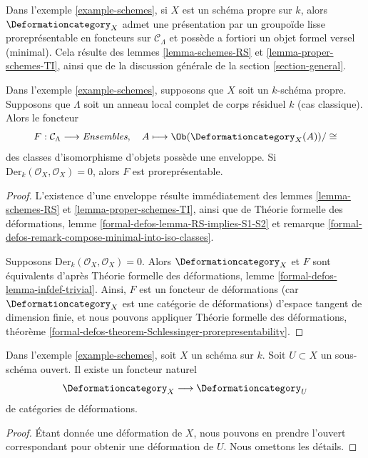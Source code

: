 \noindent
Dans l'exemple \ref{example-schemes}, si $X$ est un schéma propre sur $k$,
alors $\Deformationcategory_X$
admet une présentation par un groupoïde lisse proreprésentable en foncteurs
sur $\mathcal{C}_\Lambda$
et possède a fortiori un objet formel versel (minimal). Cela résulte
des lemmes \ref{lemma-schemes-RS} et
\ref{lemma-proper-schemes-TI},
ainsi que de la discussion générale de la section \ref{section-general}.

\begin{lemma}
\label{lemma-schemes-hull}
Dans l'exemple \ref{example-schemes}, supposons que $X$ soit un $k$-schéma propre.
Supposons que $\Lambda$ soit un anneau local complet de corps résiduel $k$
(cas classique). Alors le foncteur
$$
F : \mathcal{C}_\Lambda \longrightarrow \textit{Ensembles},\quad
A \longmapsto \Ob(\Deformationcategory_X(A))/\cong
$$
des classes d'isomorphisme d'objets possède une enveloppe. Si
$\text{Der}_k(\mathcal{O}_X, \mathcal{O}_X) = 0$, alors
$F$ est proreprésentable.
\end{lemma}

\begin{proof}
L'existence d'une enveloppe résulte immédiatement des
lemmes \ref{lemma-schemes-RS} et \ref{lemma-proper-schemes-TI}, ainsi que de
Théorie formelle des déformations, lemme \ref{formal-defos-lemma-RS-implies-S1-S2}
et remarque \ref{formal-defos-remark-compose-minimal-into-iso-classes}.

\medskip\noindent
Supposons $\text{Der}_k(\mathcal{O}_X, \mathcal{O}_X) = 0$. Alors
$\Deformationcategory_X$ et $F$ sont équivalents d'après
Théorie formelle des déformations, lemme \ref{formal-defos-lemma-infdef-trivial}.
Ainsi, $F$ est un foncteur de déformations (car $\Deformationcategory_X$ est une
catégorie de déformations) d'espace tangent de dimension finie, et nous pouvons appliquer
Théorie formelle des déformations, théorème
\ref{formal-defos-theorem-Schlessinger-prorepresentability}.
\end{proof}

\begin{lemma}
\label{lemma-open}
Dans l'exemple \ref{example-schemes}, soit $X$ un schéma sur $k$.
Soit $U \subset X$ un sous-schéma ouvert.
Il existe un foncteur naturel
$$
\Deformationcategory_X \longrightarrow \Deformationcategory_U
$$
de catégories de déformations.
\end{lemma}

\begin{proof}
Étant donnée une déformation de $X$, nous pouvons en prendre l'ouvert correspondant
pour obtenir une déformation de $U$. Nous omettons les détails.
\end{proof}

